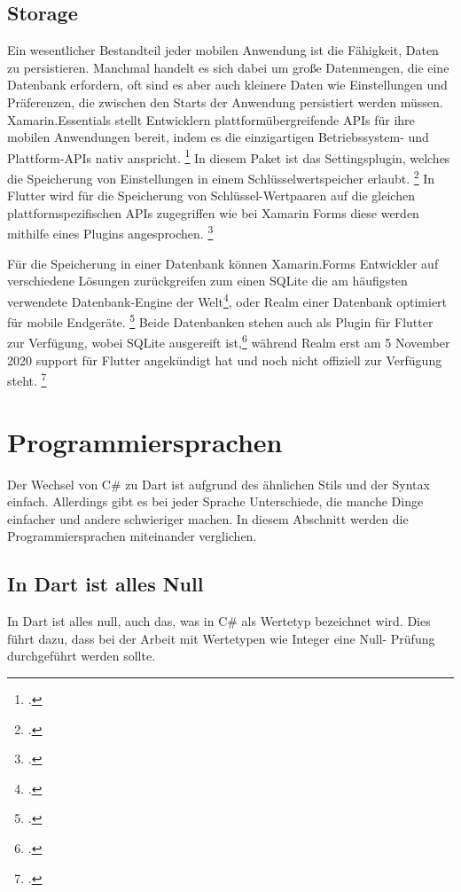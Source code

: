 \subsection{Storage}
Ein wesentlicher Bestandteil jeder mobilen Anwendung ist die Fähigkeit,  Daten zu persistieren.  Manchmal handelt es sich dabei um große Datenmengen,  die eine Datenbank erfordern,  oft sind es aber auch kleinere Daten wie Einstellungen und Präferenzen, die zwischen den Starts der Anwendung persistiert werden müssen.   
Xamarin.Essentials stellt Entwicklern plattformübergreifende APIs für ihre mobilen Anwendungen bereit,  indem es die einzigartigen Betriebssystem- und Plattform-APIs nativ anspricht. \footcite[Vgl.][Abgerufen am \today]{MicrosoftXamEssentials2020} In diesem Paket ist das Settingsplugin, welches die Speicherung von Einstellungen in einem Schlüsselwertspeicher erlaubt.  \footcite[Vgl.][Abgerufen am \today]{MicrosoftXamSettings2019} In Flutter wird für die Speicherung von Schlüssel-Wertpaaren auf die gleichen plattformspezifischen APIs zugegriffen wie bei Xamarin Forms diese werden mithilfe eines Plugins angesprochen.  \footcite[Vgl.][Abgerufen am \today]{GoogleFlutterSharedPreferences2020} 

Für die Speicherung in einer Datenbank können Xamarin.Forms Entwickler auf verschiedene Lösungen zurückgreifen zum einen SQLite  die am häufigsten verwendete Datenbank-Engine der Welt\footcite[Vgl.][Abgerufen am \today]{SQLiteConsortium2020},  oder Realm einer Datenbank optimiert für mobile Endgeräte. \footcite[Vgl.][Abgerufen am \today]{MongoDBRealm2020} Beide Datenbanken stehen auch als Plugin für Flutter zur Verfügung, wobei SQLite ausgereift ist,\footcite[Vgl.][Abgerufen am \today]{Tekartik2020} während Realm erst am 5 November 2020 support für Flutter angekündigt hat und noch nicht offiziell zur Verfügung steht. \footcite[Vgl.][Abgerufen am \today]{MongoDBFlutterSupport2020}


\section{Programmiersprachen}
Der Wechsel von C\# zu Dart ist aufgrund des ähnlichen Stils und der Syntax einfach.  Allerdings gibt es bei jeder Sprache Unterschiede,  die manche Dinge einfacher und andere schwieriger machen. In diesem Abschnitt werden die Programmiersprachen miteinander verglichen.
\subsection{In Dart ist alles Null}
In Dart ist alles null, auch das, was in C\# als Wertetyp bezeichnet wird.  Dies führt dazu,  dass bei der Arbeit mit Wertetypen wie Integer eine Null- Prüfung durchgeführt werden sollte.

